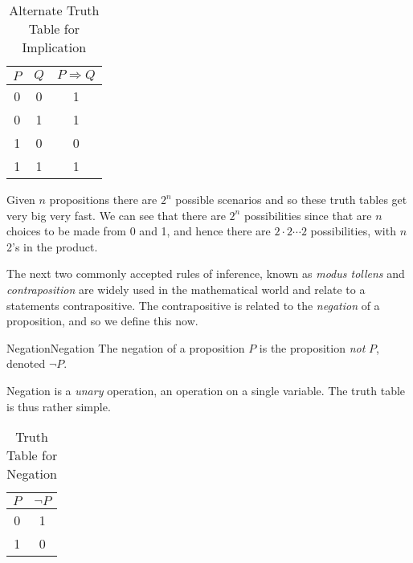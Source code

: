         \begin{table}[H]
            \centering
            \captionsetup{type=table}
            \begin{tabular}{c|c|c}
                $P$&$Q$&$P\Rightarrow{Q}$\\
                \hline
                0&0&1\\
                0&1&1\\
                1&0&0\\
                1&1&1
            \end{tabular}
            \caption{Alternate Truth Table for Implication}
            \label{tab:Alternate_Truth_Table_Implication}
        \end{table}
        Given $n$ propositions there are $2^{n}$ possible scenarios and so these
        truth tables get very big very fast. We can see that there are $2^{n}$
        possibilities since that are $n$ choices to be made from 0 and 1, and
        hence there are $2\cdot{2}\cdots{2}$ possibilities, with $n$ 2's in the
        product.
        \par\hfill\par
        The next two commonly accepted rules of inference, known as
        \textit{modus tollens} and
        \textit{contraposition} are widely used
        in the mathematical world and relate to a statements contrapositive.
        The contrapositive is related to the \textit{negation} of a proposition,
        and so we define this now.
        \begin{fdefinition}{Negation}{Negation}
            The negation of a proposition $P$ is the proposition \textit{not}
            $P$, denoted $\neg{P}$.
        \end{fdefinition}
        Negation is a \textit{unary} operation, an operation on a single
        variable. The truth table is thus rather simple.
        \begin{table}[H]
            \centering
            \captionsetup{type=table}
            \begin{tabular}{c|c}
                $P$&$\neg{P}$\\
                \hline
                0&1\\
                1&0
            \end{tabular}
            \caption{Truth Table for Negation}
            \label{tab:Truth_Table_Negation}
        \end{table}
